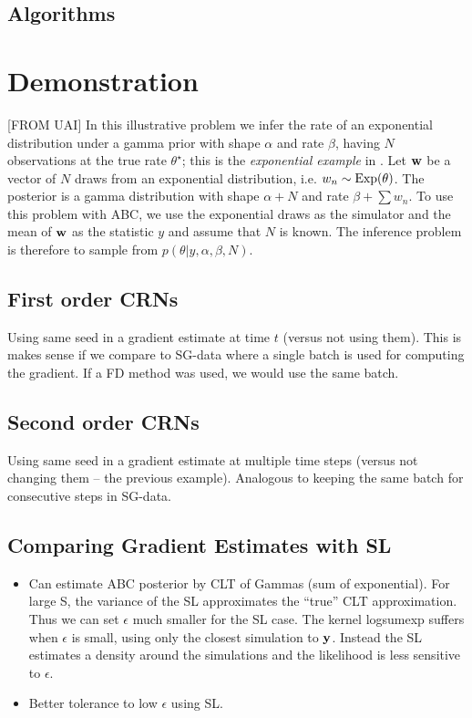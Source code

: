 \documentclass[]{article}
\begin{document}
  

\subsection{Algorithms}


\section{Demonstration}\label{sec:toy}
[FROM UAI] In this illustrative problem we infer the rate of an exponential distribution under a gamma prior with shape $\alpha$ and rate $\beta$, having $N$ observations at the true rate $\theta^{\star}$; this is the {\em exponential example} in \cite{turner2012tutorial}.  Let ${\bf w}$ be a vector of $N$ draws from an exponential distribution, i.e. $w_n \sim \operatorname{Exp}(\theta)$.  The posterior is a gamma distribution with shape $\alpha+N$ and rate $\beta + \sum w_n$.  To use this problem with ABC, we use the exponential draws as the simulator and the mean of ${\bf w}$ as the statistic $y$ and assume that $N$ is known.  The inference problem is therefore to sample from $p( \theta | y, \alpha, \beta, N )$.

\subsection{First order CRNs}
Using same seed in a gradient estimate at time $t$ (versus not using them).  This is makes sense if we compare to SG-data where a single batch is used for computing the gradient.  If a FD method was used, we would use the same batch.

\subsection{Second order CRNs}
Using same seed in a gradient estimate at multiple time steps (versus not changing them -- the previous example).  Analogous to keeping the same batch for consecutive steps in SG-data.

\subsection{Comparing Gradient Estimates with SL}
\begin{itemize}
  \item Can estimate ABC posterior by CLT of Gammas (sum of exponential).  For large S, the variance of the SL approximates the ``true'' CLT approximation.  Thus we can set $\epsilon$ much smaller for the SL case.  The kernel logsumexp suffers when $\epsilon$ is small, using only the closest simulation to ${\bf y}$.  Instead the SL estimates a density around the simulations and the likelihood is less sensitive to $\epsilon$.
  \item Better tolerance to low $\epsilon$ using SL.
\end{itemize}
\end{document}
